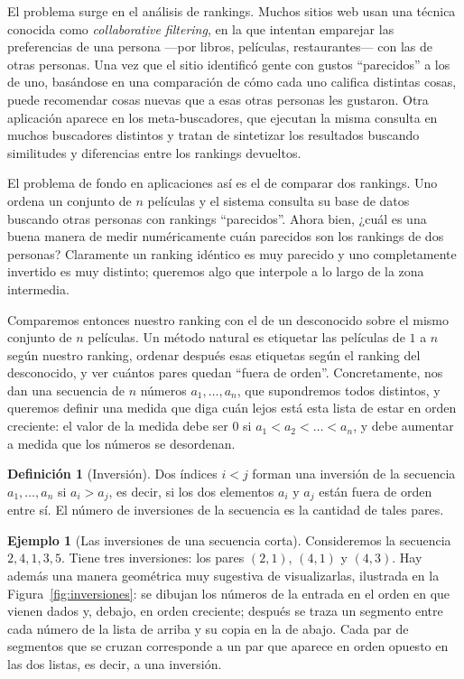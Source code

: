 \documentclass[12pt, spanish, oneside, openany]{book}
\theoremstyle{uprightplain}
\theoremstyle{definition}
\newtheorem{definicion}[teorema]{Definición}
\newtheorem{ejemplo}[teorema]{Ejemplo}
\theoremstyle{remark}
\theoremstyle{definition}
\begin{document}
El problema surge en el análisis de rankings. Muchos sitios web usan una técnica conocida como \emph{collaborative filtering}, en la que intentan emparejar las preferencias de una persona ---por libros, películas, restaurantes--- con las de otras personas. Una vez que el sitio identificó gente con gustos ``parecidos'' a los de uno, basándose en una comparación de cómo cada uno califica distintas cosas, puede recomendar cosas nuevas que a esas otras personas les gustaron. Otra aplicación aparece en los meta-buscadores, que ejecutan la misma consulta en muchos buscadores distintos y tratan de sintetizar los resultados buscando similitudes y diferencias entre los rankings devueltos.

El problema de fondo en aplicaciones así es el de comparar dos rankings. Uno ordena un conjunto de $n$ películas y el sistema consulta su base de datos buscando otras personas con rankings ``parecidos''. Ahora bien, ¿cuál es una buena manera de medir numéricamente cuán parecidos son los rankings de dos personas? Claramente un ranking idéntico es muy parecido y uno completamente invertido es muy distinto; queremos algo que interpole a lo largo de la zona intermedia.

Comparemos entonces nuestro ranking con el de un desconocido sobre el mismo conjunto de $n$ películas. Un método natural es etiquetar las películas de $1$ a $n$ según nuestro ranking, ordenar después esas etiquetas según el ranking del desconocido, y ver cuántos pares quedan ``fuera de orden''. Concretamente, nos dan una secuencia de $n$ números $a_1,\dots,a_n$, que supondremos todos distintos, y queremos definir una medida que diga cuán lejos está esta lista de estar en orden creciente: el valor de la medida debe ser $0$ si $a_1<a_2<\dots<a_n$, y debe aumentar a medida que los números se desordenan.

\begin{definicion}[Inversión]
\label{def:inversion-sec}
Dos índices $i<j$ forman una inversión de la secuencia $a_1,\dots,a_n$ si $a_i>a_j$, es decir, si los dos elementos $a_i$ y $a_j$ están fuera de orden entre sí. El número de inversiones de la secuencia es la cantidad de tales pares.
\end{definicion}

\begin{ejemplo}[Las inversiones de una secuencia corta]
\label{ej:inversiones-corta}
Consideremos la secuencia $2,4,1,3,5$. Tiene tres inversiones: los pares $(2,1)$, $(4,1)$ y $(4,3)$. Hay además una manera geométrica muy sugestiva de visualizarlas, ilustrada en la Figura~\ref{fig:inversiones}: se dibujan los números de la entrada en el orden en que vienen dados y, debajo, en orden creciente; después se traza un segmento entre cada número de la lista de arriba y su copia en la de abajo. Cada par de segmentos que se cruzan corresponde a un par que aparece en orden opuesto en las dos listas, es decir, a una inversión.
\end{ejemplo}
\end{document}
